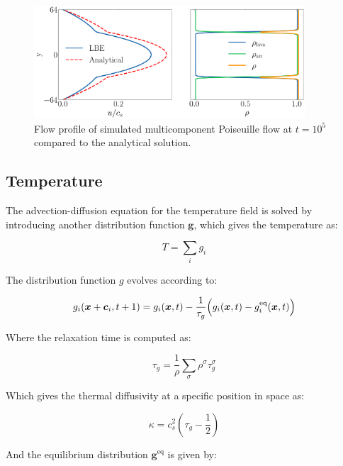 \begin{figure}[htp]
    \centering
    \includegraphics[width=0.9\textwidth]{figures/poiseuille_mc.pdf}
    \caption{Flow profile of simulated multicomponent Poiseuille flow at $t=10^5$ compared to the analytical solution.}\label{fig:poiseuille_mc}
\end{figure}

\subsection{Temperature}
The advection-diffusion equation for the temperature field is solved by introducing another distribution function $\bm{g}$, which gives the temperature as:

\begin{equation}
    T = \sum_i g_i
\end{equation}

The distribution function $g$ evolves according to:

\begin{equation}\label{eq:Lattice boltzmann equation temperature}
    g_i(\bm{x} + \bm{c}_i, t+1) = g_i(\bm{x}, t) - \frac{1}{\tau_g}\Bigl(g_i(\bm{x}, t) - g_i^{\text{eq}}(\bm{x}, t)\Bigr)
\end{equation}

Where the relaxation time is computed as:

\begin{equation}\label{eq:relaxation time }
    \tau_g = \frac{1}{\rho}\sum_\sigma \rho^\sigma \tau^\sigma_g
\end{equation}

Which gives the thermal diffusivity at a specific position in space as:

\begin{equation}
    \kappa = c_s^2 \left(\tau_g - \frac{1}{2}\right)
\end{equation}

And the equilibrium distribution $\bm{g}^{\text{eq}}$ is given by:

